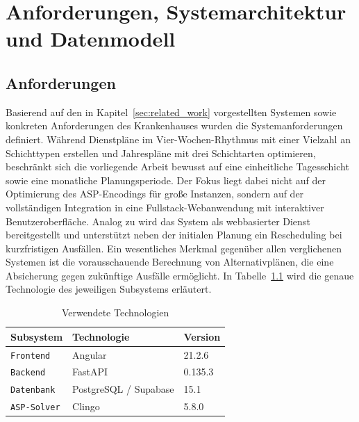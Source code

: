 
\chapter{Anforderungen, Systemarchitektur und Datenmodell} \label{sec:requirements_architecture}
\section{Anforderungen}
\label{sec:requirements}
Basierend auf den in Kapitel~\ref{sec:related_work} vorgestellten Systemen sowie konkreten Anforderungen des Krankenhauses wurden die Systemanforderungen definiert. Während \textcite{nabeshimaASPbasedNurseScheduling2026} Dienstpläne im Vier-Wochen-Rhythmus mit einer Vielzahl an Schichttypen erstellen und \textcite{alvianoNurseReschedulingAnswer2019} Jahrespläne mit drei Schichtarten optimieren, beschränkt sich die vorliegende Arbeit bewusst auf eine einheitliche Tagesschicht sowie eine monatliche Planungsperiode. Der Fokus liegt dabei nicht auf der Optimierung des ASP-Encodings für große Instanzen, sondern auf der vollständigen Integration in eine  Fullstack-Webanwendung mit interaktiver Benutzeroberfläche. Analog zu \textcite{nabeshimaASPbasedNurseScheduling2026} wird das System als webbasierter Dienst bereitgestellt und unterstützt neben der initialen Planung ein Rescheduling bei kurzfristigen Ausfällen. Ein wesentliches Merkmal gegenüber allen verglichenen Systemen ist die vorausschauende Berechnung von Alternativplänen, die eine Absicherung gegen zukünftige Ausfälle ermöglicht. In Tabelle~\ref{tab:technologien} wird die genaue Technologie des jeweiligen Subsystems erläutert.
\begin{table}[h]
	\centering
	\caption{Verwendete Technologien}
	\label{tab:technologien}
	\begin{tabularx}{\linewidth}{l>{\raggedright\arraybackslash}Xl}
		\toprule
		\textbf{Subsystem} & \textbf{Technologie} & \textbf{Version} \\
		\midrule
		\texttt{Frontend}   & Angular                & 21.2.6 \\
		\texttt{Backend}    & FastAPI                & 0.135.3 \\
		\texttt{Datenbank}  & PostgreSQL / Supabase  & 15.1 \\
		\texttt{ASP-Solver} & Clingo                 & 5.8.0 \\
		\bottomrule
	\end{tabularx}
\end{table}

